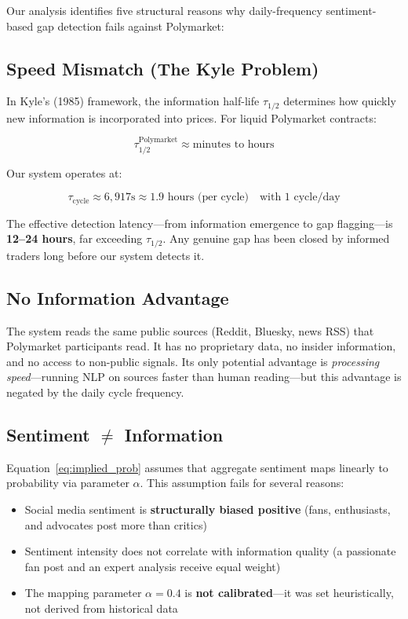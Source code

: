 \documentclass[12pt, letterpaper]{article}
\begin{document}
Our analysis identifies five structural reasons why daily-frequency sentiment-based gap detection fails against Polymarket:

\subsection{Speed Mismatch (The Kyle Problem)}

In Kyle's (1985) framework, the information half-life $\tau_{1/2}$ determines how quickly new information is incorporated into prices. For liquid Polymarket contracts:

\begin{equation}
    \tau_{1/2}^{\text{Polymarket}} \approx \text{minutes to hours}
\end{equation}

Our system operates at:

\begin{equation}
    \tau_{\text{cycle}} \approx 6{,}917\text{s} \approx 1.9\text{ hours (per cycle)} \quad \text{with 1 cycle/day}
\end{equation}

The effective detection latency---from information emergence to gap flagging---is \textbf{12--24 hours}, far exceeding $\tau_{1/2}$. Any genuine gap has been closed by informed traders long before our system detects it.

\subsection{No Information Advantage}

The system reads the same public sources (Reddit, Bluesky, news RSS) that Polymarket participants read. It has no proprietary data, no insider information, and no access to non-public signals. Its only potential advantage is \textit{processing speed}---running NLP on sources faster than human reading---but this advantage is negated by the daily cycle frequency.

\subsection{Sentiment $\neq$ Information}

Equation~\ref{eq:implied_prob} assumes that aggregate sentiment maps linearly to probability via parameter $\alpha$. This assumption fails for several reasons:

\begin{itemize}
    \item Social media sentiment is \textbf{structurally biased positive} (fans, enthusiasts, and advocates post more than critics)
    \item Sentiment intensity does not correlate with information quality (a passionate fan post and an expert analysis receive equal weight)
    \item The mapping parameter $\alpha = 0.4$ is \textbf{not calibrated}---it was set heuristically, not derived from historical data
\end{itemize}
\end{document}

